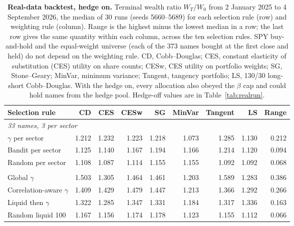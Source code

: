 \begin{table}[H]
\centering
\small
\setlength{\tabcolsep}{4pt}
\caption{\textbf{Real-data backtest, hedge on.} Terminal wealth ratio $W_T/W_0$ from 2 January 2025 to 4 September 2026, the median
of 30 runs (seeds 5660--5689) for each selection rule (row) and weighting rule (column). Range is the highest minus
the lowest median in a row; the last row gives the same quantity within each column, across the ten selection
rules. SPY buy-and-hold and the equal-weight universe (each of the 373 names bought at the first close and held) do
not depend on the weighting rule. CD, Cobb--Douglas; CES, constant elasticity of substitution (CES) utility on share
counts; CESw, CES utility on portfolio weights; SG, Stone--Geary; MinVar, minimum variance; Tangent, tangency
portfolio; LS, 130/30 long-short Cobb--Douglas. With the hedge on, every allocation also obeyed the $\beta$ cap and could hold names from the hedge pool. Hedge-off values are in Table~\ref{tab:realrun}.}
\label{tab:S-realrun-on}
\begin{tabular}{l*{8}{r}}
\toprule
Selection rule & CD & CES & CESw & SG & MinVar & Tangent & LS & Range \\
\midrule
\multicolumn{9}{l}{\emph{33 names, 3 per sector}} \\
$\gamma$ per sector & 1.212 & 1.232 & 1.223 & 1.218 & 1.073 & 1.285 & 1.130 & 0.212 \\
Bandit per sector & 1.125 & 1.140 & 1.167 & 1.194 & 1.166 & 1.214 & 1.120 & 0.094 \\
Random per sector & 1.108 & 1.087 & 1.114 & 1.155 & 1.155 & 1.092 & 1.092 & 0.068 \\
\addlinespace
\multicolumn{9}{l}{\emph{13 names}} \\
Global $\gamma$ & 1.503 & 1.305 & 1.464 & 1.461 & 1.203 & 1.589 & 1.283 & 0.386 \\
Correlation-aware $\gamma$ & 1.409 & 1.429 & 1.479 & 1.447 & 1.213 & 1.366 & 1.292 & 0.266 \\
Liquid then $\gamma$ & 1.322 & 1.285 & 1.347 & 1.331 & 1.184 & 1.317 & 1.336 & 0.163 \\
Random liquid 100 & 1.167 & 1.156 & 1.174 & 1.178 & 1.123 & 1.155 & 1.112 & 0.066 \\

\end{tabular}
\end{table}
